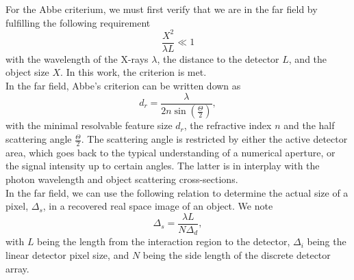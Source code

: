 %
For the Abbe criterium, we must first verify that we are in the far field by fulfilling the following requirement \cite{Williams-2010-NJP}
\begin{equation}
\frac{X^{2}}{\lambda L} \ll 1
\label{eq:far-field-test}
\end{equation}
with the wavelength of the X-rays $\lambda$, the distance to the detector $L$, and the object size $X$. In this work, the criterion is met.\\[1\baselineskip]
%
In the far field, Abbe's criterion can be written down as
\begin{equation}
    d_r = \frac{\lambda}{2n \sin(\frac{\Theta}{2})},
		\label{eq:abbe-criterion}
\end{equation}
with the minimal resolvable feature size $d_r$, the refractive index $n$ and the half scattering angle $\frac{\Theta}{2}$. The scattering angle is restricted by either the active detector area, which goes back to the typical understanding of a numerical aperture, or the signal intensity up to certain angles. The latter is in interplay with the photon wavelength and object scattering cross-sections.\\[1\baselineskip]
In the far field, we can use the following relation to determine the actual size of a pixel, $\Delta_{s}$, in a recovered real space image of an object. We note \cite{Williams-2010-NJP}
\begin{equation}
    \Delta_{s} = \frac{\lambda L}{N \Delta_{d}},
\label{eq:relation-pixel-fourier}
\end{equation}
with $L$ being the length from the interaction region to the detector, $\Delta_{i}$ being the linear detector pixel size, and $N$ being the side length of the discrete detector array.\\[1\baselineskip]
%
